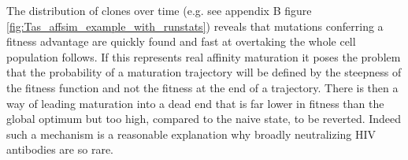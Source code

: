 The distribution of clones over time (e.g. see appendix B figure \ref{fig:Tas_affsim_example_with_runstats}) reveals that mutations conferring a fitness advantage are quickly found and fast at overtaking the whole cell population follows.
If this represents real affinity maturation it poses the problem that the probability of a maturation trajectory will be defined by the steepness of the fitness function and not the fitness at the end of a trajectory.
There is then a way of leading maturation into a dead end that is far lower in fitness than the global optimum but too high, compared to the naive state, to be reverted.
Indeed such a mechanism is a reasonable explanation why broadly neutralizing HIV antibodies are so rare.


